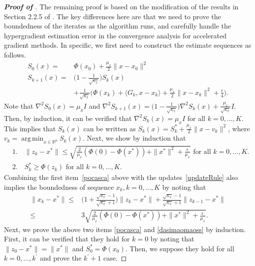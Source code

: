 \documentclass{osudissert96}
\DeclareMathOperator*{\argmin}{arg\,min}
\begin{document}
\begin{proof}[{\bf Proof of }]
The remaining proof is based on the modification of the results in Section 2.2.5 of \cite{nesterov2018lectures}. The key differences here are that  we need to prove the boundedness of the iterates  as the algorithm runs, and carefully handle the hypergradient estimation error in the convergence analysis for accelerated gradient methods. In specific, we first need to construct the estimate sequences as follows. 
\begin{align}\label{ssses_seq}
S_0(x) =& \Phi(x_0) +\frac{\mu_x}{2} \|x-x_0\|^2 \nonumber
\\S_{k+1}(x) = & \Big(1 -\frac{1}{\sqrt{\kappa_x}} \Big)S_{k}(x)  \nonumber
\\&+\frac{1}{\sqrt{\kappa_x}} \Big( \Phi(x_k) +\langle G_k,x-x_k\rangle + \frac{\mu_x}{2}\|x - x_k\|^2 +  \frac{\epsilon}{4}\Big).
\end{align}
Note that $\nabla^2S_0(x) = \mu_x I $  and $\nabla^2 S_{k+1}(x) = \big(1 -\frac{1}{\sqrt{\kappa_x}} \big)\nabla^2 S_{k}(x)+\frac{ \mu_x}{\sqrt{\kappa_x}}I$. Then, by induction, it can be verified that $\nabla^2 S_{k}(x)=\mu_x I$ for all $k=0,...,K$. This implies that $S_k(x)$ can be written as $S_k(x) = S_k^* + \frac{\mu_x}{2}\|x-v_k\|^2$, where $v_k = \argmin_{x\in\mathbb{R}^p}S_k(x)$. Next, we show by induction that
\begin{align}
&1.\quad \|z_k-x^*\|\leq \sqrt{\frac{2}{\mu_x}(\Phi(0) -\Phi(x^*))+ \|x^*\|^2+\frac{\epsilon}{\mu_x}} \text{ for all } k=0,...,K. \label{pocasca}
\\&2.\quad S_k^*\geq  \Phi(z_k) \text{ for all } k=0,...,K. \label{dasimaomaoss}
\end{align} 
Combining the first item~\cref{pocasca} above with the updates~\cref{updateRule} also implies the boundedness of sequence $x_k,k=0,...,K$ by noting that 
\begin{align}\label{boundednessofx_k}
\|x_{k}-x^*\| \leq &\Big(1+\frac{\sqrt{\kappa_x}-1}{\sqrt{\kappa_x}+1}\Big)\|z_{k} -x^*\|+ \frac{\sqrt{\kappa_x}-1}{\sqrt{\kappa_x}+1} \|z_{k-1}-x^*\| \nonumber
\\ \leq& 3\sqrt{\frac{2}{\mu_x}(\Phi(0) -\Phi(x^*))+ \|x^*\|^2+\frac{\epsilon}{\mu_x}}. 
\end{align}
Next, we prove the above two items \cref{pocasca} and \cref{dasimaomaoss} by induction. First, it can be verified that they hold for $k=0$ by noting that $\|z_0-x^*\|=\|x^*\|$ and $S_0^* = \Phi(x_0)$. Then, we suppose they hold for all $k=0,...,k^\prime$ and prove the $k^\prime+1$ case. 


\end{proof}
\end{document}
